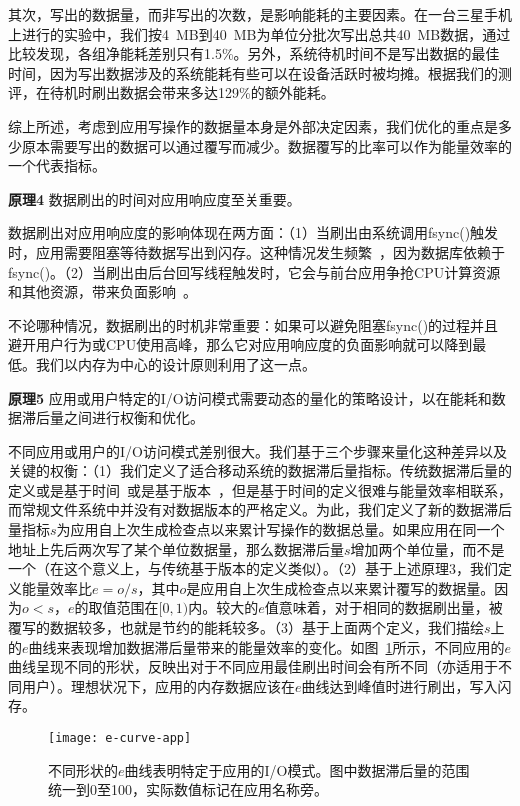 其次，写出的数据量，而非写出的次数，是影响能耗的主要因素。在一台三星手机上进行的实验中，我们按4~MB到40~MB为单位分批次写出总共40~MB数据，通过比较发现，各组净能耗差别只有1.5\%。另外，系统待机时间不是写出数据的最佳时间，因为写出数据涉及的系统能耗有些可以在设备活跃时被均摊。根据我们的测评，在待机时刷出数据会带来多达129\%的额外能耗。

综上所述，考虑到应用写操作的数据量本身是外部决定因素，我们优化的重点是多少原本需要写出的数据可以通过覆写而减少。数据覆写的比率可以作为能量效率的一个代表指标。

\textbf{原理4} 数据刷出的时间对应用响应度至关重要。

数据刷出对应用响应度的影响体现在两方面：（1）当刷出由系统调用fsync()触发时，应用需要阻塞等待数据写出到闪存。这种情况发生频繁~\cite{Jeong:2013:ISO:2535461.2535499,Lee:2012:SLD:2380356.2380367}，因为数据库依赖于fsync()。（2）当刷出由后台回写线程触发时，它会与前台应用争抢CPU计算资源和其他资源，带来负面影响~\cite{Kim:RSS:2012, Nguyen:2014:ISR:2638728.2638841}。

不论哪种情况，数据刷出的时机非常重要：如果可以避免阻塞fsync()的过程并且避开用户行为或CPU使用高峰，那么它对应用响应度的负面影响就可以降到最低。我们以内存为中心的设计原则利用了这一点。

\textbf{原理5} 应用或用户特定的I/O访问模式需要动态的量化的策略设计，以在能耗和数据滞后量之间进行权衡和优化。

不同应用或用户的I/O访问模式差别很大。我们基于三个步骤来量化这种差异以及关键的权衡：（1）我们定义了适合移动系统的数据滞后量指标。传统数据滞后量的定义或是基于时间~\cite{Ports:2010:TCA:1924943.1924963}或是基于版本~\cite{Bailis:2012:PBS:2212351.2212359}，但是基于时间的定义很难与能量效率相联系，而常规文件系统中并没有对数据版本的严格定义。为此，我们定义了新的数据滞后量指标$s$为应用自上次生成检查点以来累计写操作的数据总量。如果应用在同一个地址上先后两次写了某个单位数据量，那么数据滞后量$s$增加两个单位量，而不是一个（在这个意义上，与传统基于版本的定义类似）。（2）基于上述原理3，我们定义能量效率比$e=o/s$，其中$o$是应用自上次生成检查点以来累计覆写的数据量。因为$o<s$，$e$的取值范围在$[0,1)$内。较大的$e$值意味着，对于相同的数据刷出量，被覆写的数据较多，也就是节约的能耗较多。（3）基于上面两个定义，我们描绘$s$上的$e$曲线来表现增加数据滞后量带来的能量效率的变化。如图~\ref{fig:e-curve-app}所示，不同应用的$e$曲线呈现不同的形状，反映出对于不同应用最佳刷出时间会有所不同（亦适用于不同用户）。理想状况下，应用的内存数据应该在$e$曲线达到峰值时进行刷出，写入闪存。

\begin{figure}[!ht]
  \centering
  \texttt{[image: e-curve-app]}
  \caption{不同形状的$e$曲线表明特定于应用的I/O模式。图中数据滞后量的范围统一到0至100，实际数值标记在应用名称旁。}
  \label{fig:e-curve-app}
\end{figure}

